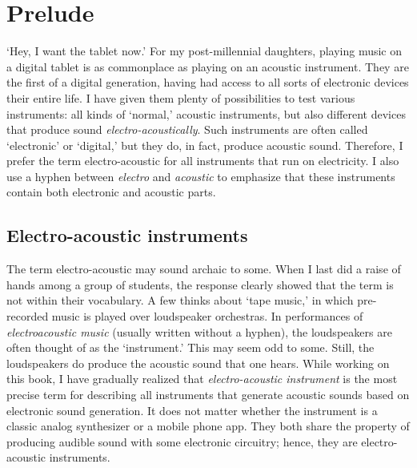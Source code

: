 \chapter{Prelude}

`Hey, I want the tablet now.' For my post-millennial daughters, playing music on a digital tablet is as commonplace as playing on an acoustic instrument. They are the first of a digital generation, having had access to all sorts of electronic devices their entire life. I have given them plenty of possibilities to test various instruments: all kinds of `normal,' acoustic instruments, but also different devices that produce sound \emph{electro-acoustically}. Such instruments are often called `electronic' or `digital,' but they do, in fact, produce acoustic sound. Therefore, I prefer the term electro-acoustic for all instruments that run on electricity. I also use a hyphen between \emph{electro} and \emph{acoustic} to emphasize that these instruments contain both electronic and acoustic parts.

\section{Electro-acoustic instruments}

The term electro-acoustic may sound archaic to some. When I last did a raise of hands among a group of students, the response clearly showed that the term is not within their vocabulary. A few thinks about `tape music,' in which pre-recorded music is played over loudspeaker orchestras. In performances of \emph{electroacoustic music} (usually written without a hyphen), the loudspeakers are often thought of as the `instrument.' This may seem odd to some. Still, the loudspeakers do produce the acoustic sound that one hears. While working on this book, I have gradually realized that \emph{electro-acoustic instrument} is the most precise term for describing all instruments that generate acoustic sounds based on electronic sound generation. It does not matter whether the instrument is a classic analog synthesizer or a mobile phone app. They both share the property of producing audible sound with some electronic circuitry; hence, they are electro-acoustic instruments.

